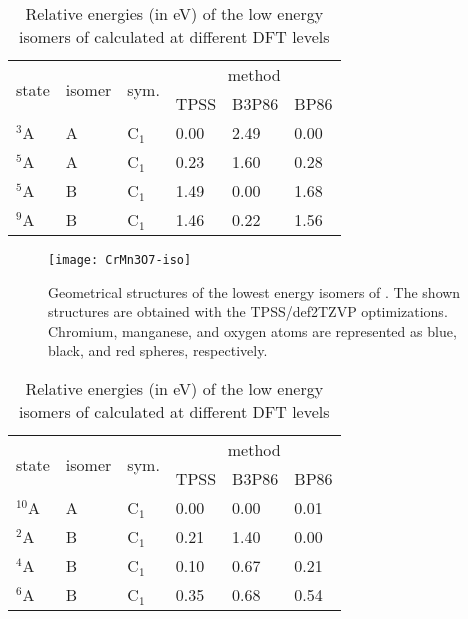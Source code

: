 \begin{table}[]
	\centering
	\caption{Relative energies (in eV) of the low energy isomers of  calculated at different DFT levels}
\begin{tabular}{@{}llllll@{}}
\toprule
\multirow{2}{*}{state} & \multirow{2}{*}{isomer} & \multirow{2}{*}{sym.} & \multicolumn{3}{c}{method} \\ \cmidrule(l){4-6} 
         &        &         & TPSS   & B3P86 & BP86   \\ \midrule
$^3$A    & A      & C$_1$   & 0.00   & 2.49  & 0.00 \\
$^5$A    & A      & C$_1$   & 0.23   & 1.60  & 0.28 \\
$^5$A    & B      & C$_1$   & 1.49   & 0.00  & 1.68 \\
$^9$A    & B      & C$_1$   & 1.46   & 0.22  & 1.56 \\ \bottomrule
\end{tabular}
\label{tbl:CrMn3O7}
\end{table}	



\begin{figure}
	\centering
	\texttt{[image: CrMn3O7-iso]}
	\caption{Geometrical structures of the lowest energy isomers of . The shown structures are obtained with the TPSS/def2TZVP optimizations. Chromium, manganese, and oxygen atoms are represented as blue, black, and red spheres, respectively.}
	\label{figs:CrMn3O7}
\end{figure}









\begin{table}[]
	\centering
	\caption{Relative energies (in eV) of the low energy isomers of  calculated at different DFT levels}
\begin{tabular}{@{}llllll@{}}
\toprule
\multirow{2}{*}{state} & \multirow{2}{*}{isomer} & \multirow{2}{*}{sym.} & \multicolumn{3}{c}{method} \\ \cmidrule(l){4-6} 
           &        &         & TPSS   & B3P86 & BP86   \\ \midrule
$^{10}$A   & A      & C$_1$   & 0.00   & 0.00  & 0.01 \\
$^2$A      & B      & C$_1$   & 0.21   & 1.40  & 0.00 \\
$^4$A      & B      & C$_1$   & 0.10   & 0.67  & 0.21 \\
$^6$A      & B      & C$_1$   & 0.35   & 0.68  & 0.54 \\ \bottomrule
\end{tabular}
\label{tbl:Cr2Mn2O7}
\end{table}	


